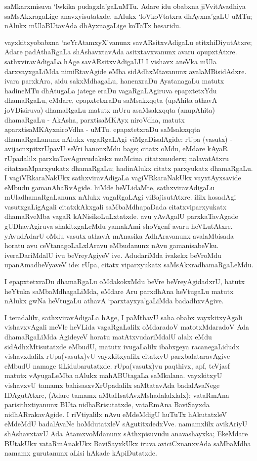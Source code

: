 saMkarxmisuva `lwkika pudagxla'gaLuMTu. Adare idu obabxna jiVvitAvadhiya saMsAkxragaLige anavxyisutatxde. nAlukx `loVkoVtatxra dhAyxna'gaLU uMTu; nAlukx mUlaBUtavAda dhAyxnagaLige koTaTx hesaridu.

vayxkitxyobabxna `neYrAtamxyX'vanunx savARsitxvAdigaLu etitxhiDiyutAtxre; Adare padAthaRgaLa shAshavxtavAda asitxtavxvanunx avaru opupxtAtxre. sathxviravAdigaLa hAge savARsitxvAdigaLU I vishavx aneVka mUla darxvayxgaLiMda nimiRtavAgide eMba sidAdhxMtavanunx avalaMBisidAdxre. ivara parxkAra, aidu sakxMdhagaLu, hanenxraDu AyatanagaLu matutx hadineMTu dhAtugaLa jatege eraDu vagaRgaLAgiruva epapxtetxYdu dhamaRgaLu, eMdare, epapxtetxraDu saMsakxqqta (upAhita athavA joVDisiruva) dhamaRgaLu matutx mUru asaMsakxqqta (anupAhita) dhamaRgaLu - AkAsha, parxtisaMKAyx niroVdha, matutx aparxtisaMKAyxniroVdha - uMTu. epapxtetxraDu saMsakxqqta dhamaRgaLanunx nAlukx vagaRgaLAgi viMgaDisalAgide: rUpa (vasutx) - avijacnxpitxrUpavU seVri hanonxMdu bage; citatx oMdu, eMdare kAyaR rUpadalilx parxkaTavAguvudakekx muMcina citatxmuderx; nalavatAtxru citatxsaMparxyukatx dhamaRgaLu; hadinAlukx citatx parxyukatx dhamaRgaLu. I vagiVRkaraNakUkx sathxviravAdigaLa vagiVRkaraNakUkx vayxtAyxsavide eMbudu gamanAhaRvAgide. hiMde heVLidaMte, sathxviravAdigaLu mUladhamaRgaLanunx nAlukx vagaRgaLAgi viBajisutAtxre. ililx hosadAgi vasutxgaLigAgali citatxkAkxgali saMbaMdhapaDada citatxviparxyukatx dhamaRveMba vagaR kANisikoLuLxtatxde. avu yAvAgalU parxkaTavAgade gUDhavAgiruva shakitxgaLeMdu yamakAmi shoVgenf avaru heVLutAtxre. yAvudAdarU oMdu vasutx athavA mAnasika AdhAravanunx avalaMbisada horatu avu ceVtanagoLaLxlAravu eMbudanunx nAvu gamanisabeVku. iveraDariMdalU ivu beVreyAgiyeV ive. AdudariMda ivakekx beVroMdu upanAmadheVyaveV ide: rUpa, citatx viparxyukatx saMsAkxradhamaRgaLeMdu.

I epapxtetxraDu dhamaRgaLu oMdakokxMdu beVre beVreyAgidadxrU, hatutx heYtuka saMbaMdhagaLiMda, eMdare Aru parxdhAna heVtugaLu matutx nAlukx gwNa heVtugaLu athavA `parxtayxya'gaLiMda badadhxvAgive.

I teradalilx, sathxviravAdigaLa hAge, I paMthavU saha obabx vayxkitxyAgali vishavxvAgali meVle heVLida vagaRgaLalilx oMdaradoV matotxMdaradoV Ada dhamaRgaLiMda AgideyeV horatu matAtxvudariMdalU alalx eMdu sidAdhxMtisutatxde eMbudU, matutx ivugaLalilx ibabxgeya racanegaLidudx vishavxdalilx rUpa(vasutx)vU vayxkitxyalilx citatxvU parxbalataravAgive eMbudU namage tiLidubarutatxde. rUpa(vasutx)vu paqthivx, apf, teVjasf matutx vAyugaLeMba nAlukx mahABUtagaLa saMkalana. vayxkitxyU vishavxvU tamamx bahisasxvXrUpadalilx saMtatavAda badalAvaNege IDAgutAtxre, (Adare tamamx aMtaHsatAvxMshadalalxlalx); vataRmAna parisithxtiyanunx BUta nidhaRrisutatxde, vataRmAna BaviSayxda nidhARrakavAgide. I riVtiyalilx nAvu eMdeMdigU huTuTx hAkutatxleV eMdeMdU badalAvaNe hoMdutatxleV sAgutitxdedxVve. namamxlilx avikAriyU shAshavxtavU Ada AtamxvoMdanunx sAthxpisuvudu anavashayxka; EkeMdare BUtakUkx vataRmAnakUkx BaviSayxkUkx iruva aviciCxnanxvAda saMbaMdha namamx gurutanunx aLisi hAkade kApiDutatxde.

